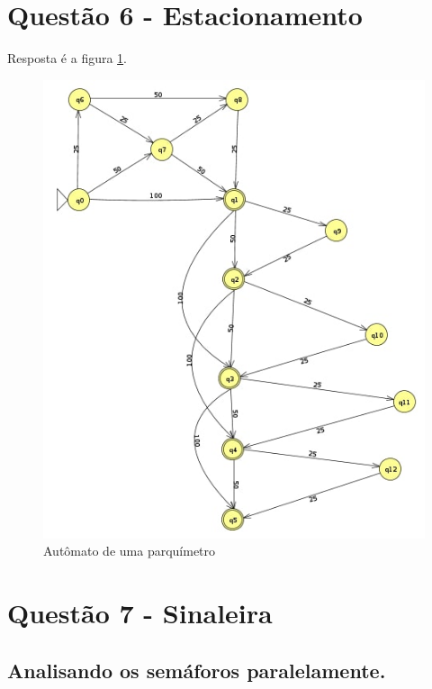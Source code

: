 \documentclass[11pt]{article}
\begin{document}
\pagebreak
\section{Questão 6 - Estacionamento}
\label{sec:orge5f19b3}
Resposta é a figura \ref{fig:org5fd4825}.
\begin{figure}[htbp]
\centering
\includegraphics[width=.9\linewidth]{./q6/estacionamento.jpg}
\caption{\label{fig:org5fd4825}
Autômato de uma parquímetro}
\end{figure}
\pagebreak
\section{Questão 7 - Sinaleira}
\label{sec:org0e51221}
\subsection{Analisando os semáforos paralelamente.}
\label{sec:org423dfdb}
\end{document}
